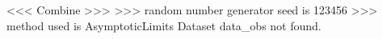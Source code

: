  <<< Combine >>> 
>>> random number generator seed is 123456
>>> method used is AsymptoticLimits
Dataset data_obs not found.
